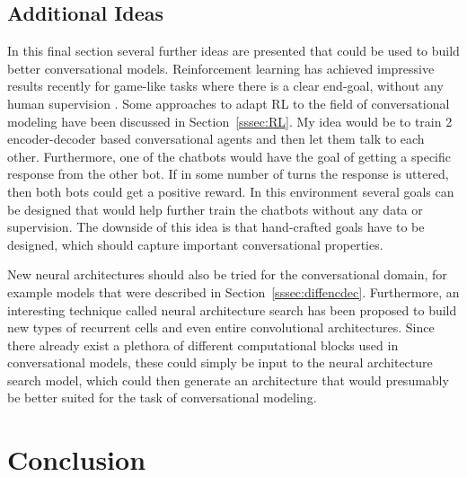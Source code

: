 \documentclass[12pt]{article}
\begin{document}
\subsection{Additional Ideas} \label{ssec:63}
In this final section several further ideas are presented that could be used to build better conversational models. Reinforcement learning has achieved impressive results recently for game-like tasks where there is a clear end-goal, without any human supervision \cite{alphagozero}. Some approaches to adapt RL to the field of conversational modeling have been discussed in Section~\ref{sssec:RL}. My idea would be to train 2 encoder-decoder based conversational agents and then let them talk to each other. Furthermore, one of the chatbots would have the goal of getting a specific response from the other bot. If in some number of turns the response is uttered, then both bots could get a positive reward. In this environment several goals can be designed that would help further train the chatbots without any data or supervision. The downside of this idea is that hand-crafted goals have to be designed, which should capture important conversational properties.

New neural architectures should also be tried for the conversational domain, for example models that were described in Section~\ref{sssec:diffencdec}. Furthermore, an interesting technique called neural architecture search \cite{Zoph:2016} has been proposed to build new types of recurrent cells and even entire convolutional architectures. Since there already exist a plethora of different computational blocks used in conversational models, these could simply be input to the neural architecture search model, which could then generate an architecture that would presumably be better suited for the task of conversational modeling.

\newpage\section{Conclusion} \label{sec:conclusion}
\end{document}
